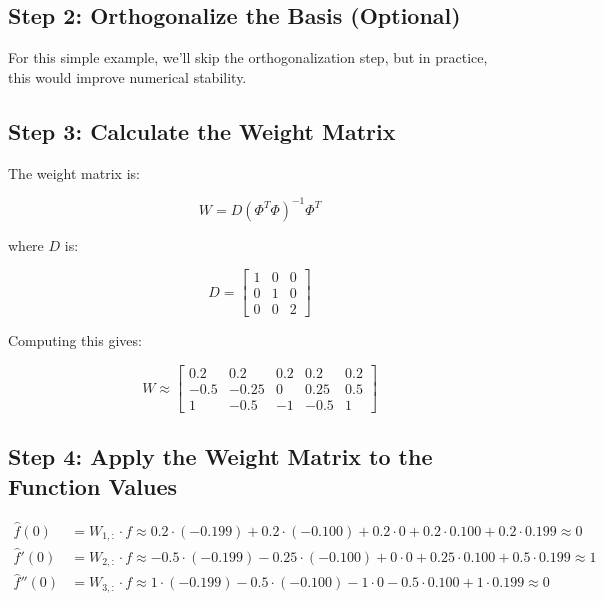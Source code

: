 \documentclass{article}
\begin{document}
\subsection{Step 2: Orthogonalize the Basis (Optional)}

For this simple example, we'll skip the orthogonalization step, but in practice, this would improve numerical stability.

\subsection{Step 3: Calculate the Weight Matrix}

The weight matrix is:

\begin{equation}
W = D (\Phi^T \Phi)^{-1} \Phi^T
\end{equation}

where $D$ is:

\begin{equation}
D = \begin{bmatrix}
1 & 0 & 0 \\
0 & 1 & 0 \\
0 & 0 & 2
\end{bmatrix}
\end{equation}

Computing this gives:

\begin{equation}
W \approx \begin{bmatrix}
0.2 & 0.2 & 0.2 & 0.2 & 0.2 \\
-0.5 & -0.25 & 0 & 0.25 & 0.5 \\
1 & -0.5 & -1 & -0.5 & 1
\end{bmatrix}
\end{equation}

\subsection{Step 4: Apply the Weight Matrix to the Function Values}

\begin{align}
\hat{f}(0) &= W_{1,:} \cdot f \approx 0.2 \cdot (-0.199) + 0.2 \cdot (-0.100) + 0.2 \cdot 0 + 0.2 \cdot 0.100 + 0.2 \cdot 0.199 \approx 0 \\
\hat{f}'(0) &= W_{2,:} \cdot f \approx -0.5 \cdot (-0.199) - 0.25 \cdot (-0.100) + 0 \cdot 0 + 0.25 \cdot 0.100 + 0.5 \cdot 0.199 \approx 1 \\
\hat{f}''(0) &= W_{3,:} \cdot f \approx 1 \cdot (-0.199) - 0.5 \cdot (-0.100) - 1 \cdot 0 - 0.5 \cdot 0.100 + 1 \cdot 0.199 \approx 0
\end{align}
\end{document}
